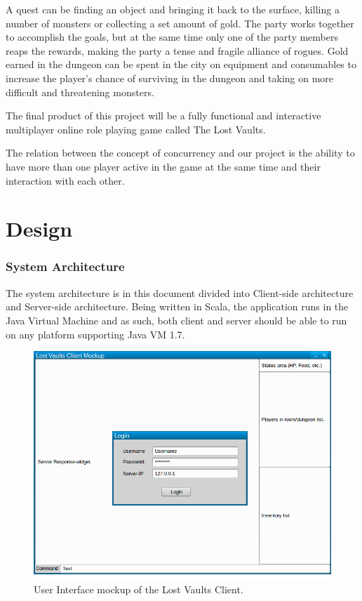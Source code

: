 \documentclass[a4paper]{article}
\begin{document}
A quest can be finding an object and bringing it back to the surface, killing a number of monsters or collecting a set amount of gold. The party works together to accomplish 
the goals, but at the same time only one of the party members reaps the rewards, making the party a tense and fragile alliance of rogues. Gold earned in the dungeon can be 
spent in the city on equipment and consumables to increase the player’s chance of surviving in the dungeon and taking on more difficult and threatening monsters.

The final product of this project will be a fully functional and interactive multiplayer online role playing game called The Lost Vaults.

The relation between the concept of concurrency and our project is the ability to have more than one player active in the game at the same time and their interaction with each other.
\part{Design}
\section{System Architecture}
The system architecture is in this document divided into  Client-side architecture and Server-side architecture. Being written in Scala, the application runs in the Java Virtual Machine and 
as such, both client and server should be able to run on any platform supporting Java VM 1.7.
\begin{figure}[hbt]
\centering
\includegraphics[width=1.0\textwidth]{clientmockup}
\caption{\label{fig:Client}User Interface mockup of the Lost Vaults Client.}
\end{figure}
\end{document}
